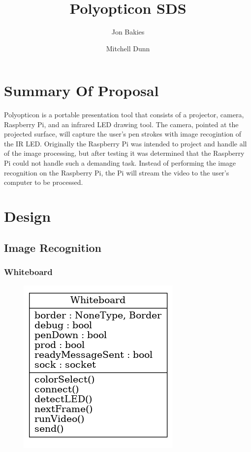\documentclass[12pt]{article}
\begin{document}
\title{Polyopticon SDS}
\author{Jon Bakies \and Mitchell Dunn} 

\maketitle
\newpage

\tableofcontents
\newpage

\section{Summary Of Proposal}
\paragraph{}
Polyopticon is a portable presentation tool that consists of a projector, camera, Raspberry Pi, and an infrared LED drawing tool.
The camera, pointed at the projected surface, will capture the user's pen strokes with image recogintion of the IR LED.
Originally the Raspberry Pi was intended to project and handle all of the image processing, but after testing it was determined that the Raspberry Pi could not handle such a demanding task.
Instead of performing the image recognition on the Raspberry Pi, the Pi will stream the video to the user's computer to be processed.

\section{Design}
\subsection{Image Recognition}
\subsubsection{Whiteboard}
\begin{figure}[ht!]
\centering
\includegraphics{whiteboard.png}
\end{figure}
\end{document}

